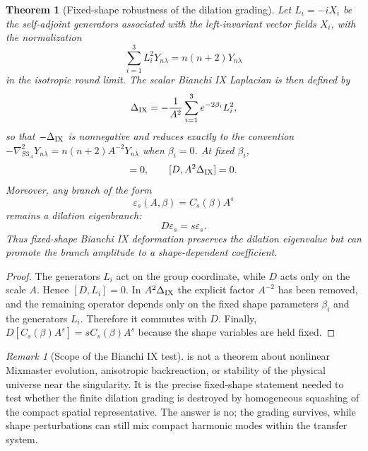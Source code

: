 \documentclass[11pt,a4paper]{article}
\def\Sthree{S3}%
\def\Dil{D}%
\numberwithin{equation}{section}
\theoremstyle{definition}
\theoremstyle{plain}
\newtheorem{theorem}[criterion]{Theorem}
\theoremstyle{remark}
\newtheorem{remark}[criterion]{Remark}
\newcommand{\Sthree}{S^3}
\newcommand{\Dil}{\mathscr{D}}
\begin{document}
\begin{theorem}[Fixed-shape robustness of the dilation grading]
\label{thm:BIX-dilation-grading}
Let \(L_i=-iX_i\) be the self-adjoint generators associated with the
left-invariant vector fields \(X_i\), with the normalization
\begin{equation}
\sum_{i=1}^3L_i^2Y_{n\lambda}=n(n+2)Y_{n\lambda}
\end{equation}
in the isotropic round limit.  The scalar Bianchi IX Laplacian is then defined by
\begin{equation}
\Delta_{\rm IX}
=-\frac1{A^2}\sum_{i=1}^3 e^{-2\beta_i}L_i^2,
\label{eq:BIX-laplacian}
\end{equation}
so that \(-\Delta_{\rm IX}\) is nonnegative and reduces exactly to the convention
\(-\nabla^2_{\Sthree_A}Y_{n\lambda}=n(n+2)A^{-2}Y_{n\lambda}\) when
\(\beta_i=0\).  At fixed \(\beta_i\),
\begin{equation}
[\Dil,L_i]=0,
\qquad
[\Dil,A^2\Delta_{\rm IX}]=0.
\end{equation}
Moreover, any branch of the form
\begin{equation}
\varepsilon_s(A,\beta)=C_s(\beta)A^s
\end{equation}
remains a dilation eigenbranch:
\begin{equation}
\Dil\varepsilon_s=s\varepsilon_s.
\end{equation}
Thus fixed-shape Bianchi IX deformation preserves the dilation eigenvalue but
can promote the branch amplitude to a shape-dependent coefficient.
\end{theorem}

\begin{proof}
The generators \(L_i\) act on the group coordinate, while \(\Dil\) acts only on
the scale \(A\).  Hence \([\Dil,L_i]=0\).  In \(A^2\Delta_{\rm IX}\) the explicit
factor \(A^{-2}\) has been removed, and the remaining operator depends only on
the fixed shape parameters \(\beta_i\) and the generators \(L_i\).  Therefore it
commutes with \(\Dil\).  Finally,
\(\Dil[C_s(\beta)A^s]=sC_s(\beta)A^s\) because the shape variables are held fixed.
\end{proof}

\begin{remark}[Scope of the Bianchi IX test]
 is not a theorem about nonlinear Mixmaster
evolution, anisotropic backreaction, or stability of the physical universe near
the singularity.  It is the precise fixed-shape statement needed to test whether
the finite dilation grading is destroyed by homogeneous squashing of the compact
spatial representative.  The answer is no; the grading survives, while shape
perturbations can still mix compact harmonic modes within the transfer system.
\end{remark}
\end{document}
